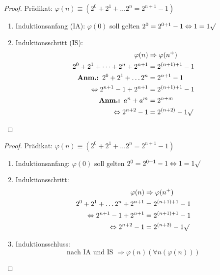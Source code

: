 \documentclass[12pt%
,aspectratio=169%
]{beamer}
\begin{document}
\begin{frame}
\begin{proof}
Prädikat: $\varphi(n) \equiv (2^0 + 2^1 + \dots 2^n = 2^{n+1}-1)$
\begin{enumerate}
	\item Induktionsanfang (IA): $\varphi(0)$ soll gelten
$2^0 = 2^{0+1}-1 \Leftrightarrow 1 = 1 \surd$\\
	\item Induktionsschritt (IS):
\begin{align*}
\varphi(n) & \Rightarrow \varphi(n^+)\\
2^0 + 2^1 + \dots + 2^n + 2^{n+1} &= 2^{(n+1)+1}-1\\
\textbf{Anm.: } 2^0 + 2^1 + \dots 2^n &= 2^{n+1} -1  \\
\Leftrightarrow  2^{n+1} -1 + 2^{n+1} &= 2^{(n+1)+1}-1\\
\textbf{Anm.: } a^n + a^m &= 2^{n+m}\\
\Leftrightarrow  2^{n+2} -1 &= 2^{(n+2)}-1 \surd
\end{align*}
\end{enumerate}
\end{proof}
\end{frame}

\begin{frame}
\begin{proof}
Prädikat: $\varphi(n) \equiv (2^0 + 2^1 + \dots 2^n = 2^{n+1}-1)$
\begin{enumerate}
	\item Induktionsanfang: $\varphi(0)$ soll gelten
$2^0 = 2^{0+1}-1 \Leftrightarrow 1 = 1 \surd$\\
	\item Induktionsschritt:
\begin{align*}
\varphi(n) & \Rightarrow \varphi(n^+)\\
2^0 + 2^1 + \dots 2^n + 2^{n+1} &= 2^{(n+1)+1}-1\\
\Leftrightarrow  2^{n+1} -1 + 2^{n+1} &= 2^{(n+1)+1}-1\\
\Leftrightarrow  2^{n+2} -1 &= 2^{(n+2)}-1 \surd
\end{align*}
	\item Induktionsschluss:
$$\text{nach IA und IS } \Rightarrow \varphi(n) (\forall n(\varphi(n)))$$
\end{enumerate}
\end{proof}
\end{frame}
\end{document}
